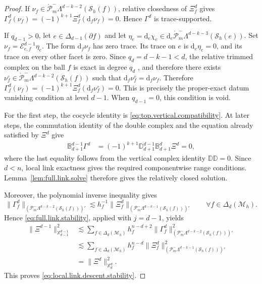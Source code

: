 \documentclass[a4paper,11pt]{article}
\theoremstyle{definition}
\newcommand{\DIFF}{\mathrm{d}}
\newcommand{\Mh}{\mathcal{M}_h}
\newcommand{\Sh}{\mathcal{S}_h}
\newcommand{\FM}[1]{\Delta_{#1}}
\newcommand{\PLtrim}[2]{\mathcal{P}_{#1}^{-}\Lambda^{#2}}
\newcommand{\PLtrimz}[2]{\mathring{\mathcal P}_{#1}^{-}\Lambda^{#2}}
\begin{document}
\begin{proof}
If $\nu_f\in\PLtrimz{m}{d-k-2}(\Sh(f))$, relative closedness of $\Xi_f^d$ gives $\Gamma_f^d(\nu_f) = (-1)^{k+1}\Xi_f^d(\DIFF_f\nu_f) =0$.
Hence $\Gamma^d$ is trace-supported.

If $q_{d-1}>0$, let $e\in\FM{d-1}(\partial f)$ and let $\eta_e=\DIFF_e\chi_e\in\DIFF_e\PLtrimz{m}{d-k-3}(\Sh(e))$.
Set $\nu_f=\mathcal E_{e,f}^{d-1}\eta_e$.
The form $\DIFF_f\nu_f$ has zero trace.
Its trace on $e$ is $\DIFF_e\eta_e=0$, and its trace on every other facet is zero.
Since $q_d=d-k-1<d$, the relative trimmed complex on the ball $f$ is exact in degree $q_d$ \cite{Arnold.Falk.ea:06,Arnold.Falk.ea:09}, and therefore there exists $\nu_f^\circ\in\PLtrimz{m}{d-k-2}(\Sh(f))$ such that $\DIFF_f\nu_f^\circ=\DIFF_f\nu_f$.
Therefore $\Gamma_f^d(\nu_f) = (-1)^{k+1} \Xi_f^d(\DIFF_f\nu_f^\circ) =0$.
This is precisely the proper-exact datum vanishing condition at level $d-1$.
When $q_{d-1}=0$, this condition is void.

For the first step, the cocycle identity is \eqref{eq:top.vertical.compatibility}.
At later steps, the commutation identity of the double complex and the equation already satisfied by $\Xi^d$ give
\[
\begin{aligned}
\mathbb B_{d+1}^{d-1}\Gamma^d
&={}
(-1)^{k+1}
\mathbb D_{d+1}^{d-1}
\mathbb B_{d+1}^{d}\Xi^d
=0,
\end{aligned}
\]
where the last equality follows from the vertical complex identity $\mathbb D\mathbb D=0$.
Since $d<n$, local link exactness gives the required componentwise range conditions.
Lemma~\ref{lem:full.link.solve} therefore gives the relatively closed solution.

Moreover, the polynomial inverse inequality gives
\[
  \|\Gamma_f^d\|_{
    \left(
      \PLtrim{m}{d-k-2}(\Sh(f))
    \right)'
  }
  \lesssim
  h_f^{-1}
  \|\Xi_f^d\|_{
    \left(
      \PLtrim{m}{d-k-1}(\Sh(f))
    \right)'
  }
  \qquad
  \forall f\in\FM{d}(\Mh).
\]
Hence \eqref{eq:full.link.stability}, applied with $j=d-1$, yields
\[
\begin{aligned}
  \|\Xi^{d-1}\|_{\mathbb X_{d-1}^{d-1}}^2
  &\lesssim
  \sum_{f\in\FM{d}(\Mh)}
  h_f^{n-d+2}
  \|\Gamma_f^d\|_{
    \left(
      \PLtrim{m}{d-k-2}(\Sh(f))
    \right)'
  }^2
  \\
  &\lesssim
  \sum_{f\in\FM{d}(\Mh)}
  h_f^{n-d}
  \|\Xi_f^d\|_{
    \left(
      \PLtrim{m}{d-k-1}(\Sh(f))
    \right)'
  }^2
  \\
  &=
  \|\Xi^d\|_{\mathbb X_d^d}^2.
\end{aligned}
\]
This proves \eqref{eq:local.link.descent.stability}.
\end{proof}
\end{document}
